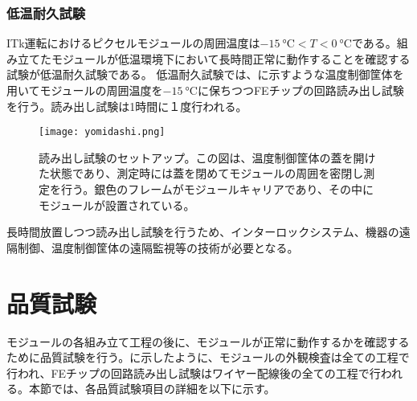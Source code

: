 \subsubsection*{低温耐久試験}

ITk運転におけるピクセルモジュールの周囲温度は$-15\ \si{\degreeCelsius}<T<0\ \si{\degreeCelsius}$である。組み立てたモジュールが低温環境下において長時間正常に動作することを確認する試験が低温耐久試験である。
低温耐久試験では、に示すような温度制御筐体を用いてモジュールの周囲温度を$-15\ \si{\degreeCelsius}$に保ちつつFEチップの回路読み出し試験を行う。読み出し試験は1時間に１度行われる。
\begin{figure}[tbp]
  \centering
  \texttt{[image: yomidashi.png]}
  \caption[読み出し試験のセットアップ]{読み出し試験のセットアップ。この図は、温度制御筐体の蓋を開けた状態であり、測定時には蓋を閉めてモジュールの周囲を密閉し測定を行う。銀色のフレームがモジュールキャリアであり、その中にモジュールが設置されている。}
  \label{fig:yomidashi}
\end{figure}

長時間放置しつつ読み出し試験を行うため、インターロックシステム、機器の遠隔制御、温度制御筐体の遠隔監視等の技術が必要となる。

\section{品質試験}
\label{sec:QCtest}

モジュールの各組み立て工程の後に、モジュールが正常に動作するかを確認するために品質試験を行う。に示したように、モジュールの外観検査は全ての工程で行われ、FEチップの回路読み出し試験はワイヤー配線後の全ての工程で行われる。本節では、各品質試験項目の詳細を以下に示す。



